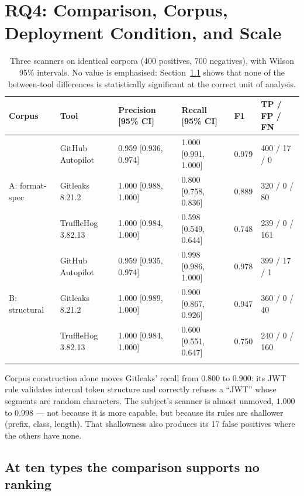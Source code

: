\documentclass[pdflatex,sn-basic]{sn-jnl}
\begin{document}
\section{RQ4: Comparison, Corpus, Deployment Condition, and Scale}
\label{sec:rq4}

\begin{table}[t]
\centering
\caption{Three scanners on identical corpora (400 positives, 700 negatives), with Wilson 95\% intervals. No value is emphasised: Section~\ref{sec:paired} shows that none of the between-tool differences is statistically significant at the correct unit of analysis.}
\label{tab:comparative}
\footnotesize
\setlength{\tabcolsep}{3pt}
\begin{tabular}{@{}llllll@{}}
\toprule
Corpus & Tool & Precision [95\% CI] & Recall [95\% CI] & F1 & TP / FP / FN \\
\midrule
\multirow{3}{*}{A: format-spec}
 & GitHub Autopilot & 0.959 [0.936, 0.974] & 1.000 [0.991, 1.000] & 0.979 & 400 / 17 / 0 \\
 & Gitleaks 8.21.2 & 1.000 [0.988, 1.000] & 0.800 [0.758, 0.836] & 0.889 & 320 / 0 / 80 \\
 & TruffleHog 3.82.13 & 1.000 [0.984, 1.000] & 0.598 [0.549, 0.644] & 0.748 & 239 / 0 / 161 \\
\midrule
\multirow{3}{*}{B: structural}
 & GitHub Autopilot & 0.959 [0.935, 0.974] & 0.998 [0.986, 1.000] & 0.978 & 399 / 17 / 1 \\
 & Gitleaks 8.21.2 & 1.000 [0.989, 1.000] & 0.900 [0.867, 0.926] & 0.947 & 360 / 0 / 40 \\
 & TruffleHog 3.82.13 & 1.000 [0.984, 1.000] & 0.600 [0.551, 0.647] & 0.750 & 240 / 0 / 160 \\
\botrule
\end{tabular}
\end{table}

Corpus construction alone moves Gitleaks' recall from $0.800$ to $0.900$: its JWT rule validates internal token structure and correctly refuses a ``JWT'' whose segments are random characters. The subject's scanner is almost unmoved, $1.000$ to $0.998$ --- not because it is more capable, but because its rules are shallower (prefix, class, length). That shallowness also produces its 17 false positives where the others have none.

\subsection{At ten types the comparison supports no ranking}
\label{sec:paired}
\end{document}
